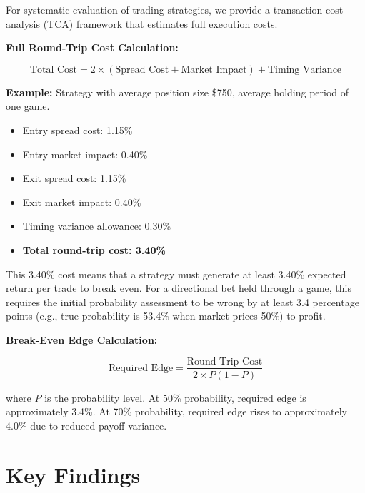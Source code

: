 For systematic evaluation of trading strategies, we provide a transaction cost analysis (TCA) framework that estimates full execution costs.

\textbf{Full Round-Trip Cost Calculation:}

\begin{equation}
\text{Total Cost} = 2 \times (\text{Spread Cost} + \text{Market Impact}) + \text{Timing Variance}
\end{equation}

\textbf{Example:} Strategy with average position size \$750, average holding period of one game.

\begin{itemize}
    \item Entry spread cost: 1.15\%
    \item Entry market impact: 0.40\%
    \item Exit spread cost: 1.15\%
    \item Exit market impact: 0.40\%
    \item Timing variance allowance: 0.30\%
    \item \textbf{Total round-trip cost: 3.40\%}
\end{itemize}

This 3.40\% cost means that a strategy must generate at least 3.40\% expected return per trade to break even. For a directional bet held through a game, this requires the initial probability assessment to be wrong by at least 3.4 percentage points (e.g., true probability is 53.4\% when market prices 50\%) to profit.

\textbf{Break-Even Edge Calculation:}

\begin{equation}
\text{Required Edge} = \frac{\text{Round-Trip Cost}}{2 \times P(1-P)}
\end{equation}

where $P$ is the probability level. At 50\% probability, required edge is approximately 3.4\%. At 70\% probability, required edge rises to approximately 4.0\% due to reduced payoff variance.

\section{Key Findings}

